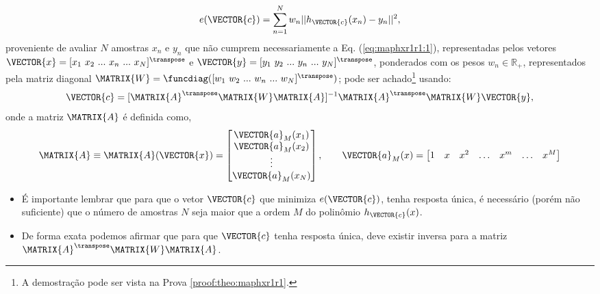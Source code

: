 \begin{theorem}
\begin{equation}\label{eq:maphxr1r1:2}
e(\VECTOR{c}) =  \sum_{n=1}^{N} w_n||h_{\VECTOR{c}}(x_n)-y_n||^2,
\end{equation}
proveniente de avaliar $N$ amostras $x_n$ e $y_n$ que não cumprem necessariamente a Eq. (\ref{eq:maphxr1r1:1}), 
representadas pelos vetores $\VECTOR{x}=[x_1~ x_2~ ...~ x_n~ ...~ x_N]^{\transpose}$ e $\VECTOR{y}=[y_1~ y_2~ ...~ y_n~ ...~ y_N]^{\transpose}$,
ponderados com os pesos $w_n \in \mathbb{R}_+$, representados pela matriz diagonal $\MATRIX{W}=\funcdiag([w_1~ w_2~ ...~ w_n~ ...~ w_N]^{\transpose})$;
pode ser achado\footnote{A demostração pode ser vista na Prova \ref{proof:theo:maphxr1r1}.} usando:
\begin{equation}\label{eq:maphxr1r1:3}
\VECTOR{c}=[\MATRIX{A}^{\transpose}\MATRIX{W}\MATRIX{A}]^{-1}\MATRIX{A}^{\transpose}\MATRIX{W}\VECTOR{y},
\end{equation}
onde a matriz $\MATRIX{A}$ é definida como,
\begin{equation}\label{eq:maphxr1r1:4}
\MATRIX{A}\equiv \MATRIX{A}(\VECTOR{x})=\begin{bmatrix}
\VECTOR{a}_M(x_1)\\
\VECTOR{a}_M(x_2)\\
\vdots\\
\VECTOR{a}_M(x_N)\\
\end{bmatrix}, \qquad
\VECTOR{a}_M(x)=\begin{bmatrix}
1& x& x^2& \hdots & x^m& \hdots& x^M
\end{bmatrix}
\end{equation}

\end{theorem}


\begin{tcbattention}
\begin{itemize}
\item É importante lembrar que para que o vetor $\VECTOR{c}$
que minimiza $e(\VECTOR{c})$, tenha resposta única,
é necessário (porém não suficiente) que o número de amostras $N$ seja maior que a ordem $M$ do polinômio $h_{\VECTOR{c}}(x)$.

\item De forma exata podemos afirmar que para que $\VECTOR{c}$ tenha resposta única,
deve existir inversa para a matriz $\MATRIX{A}^{\transpose}\MATRIX{W}\MATRIX{A}$.

\end{itemize}
\end{tcbattention}


